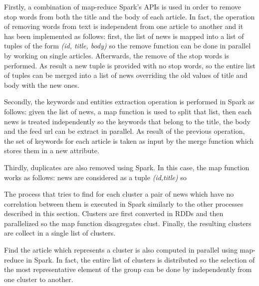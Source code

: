 \documentclass{acm_proc_article-sp}
\begin{document}

Firstly, a combination of map-reduce Spark's APIs is used in order to remove stop words from both the title and the body of each article. In fact, the operation of removing words from text is independent from one article to another and it has been implemented as follows: first, the list of news is mapped into a list of tuples of the form \textit{(id, title, body)} so the remove function can be done in parallel by working on single articles. Afterwards, the remove of the stop words is performed. As result a new tuple is provided with no stop words, so the entire list of tuples can be merged into a list of news overriding the old values of title and body with the new ones.



Secondly, the keywords and entities extraction operation is performed in Spark as follows: given the list of news, a map function is used to split that list, then each news is treated independently so the keywords that belong to the title, the body and the feed url can be extract in parallel. As result of the previous operation, the set of keywords for each article is taken as input by the merge function which stores them in a new attribute.

Thirdly, duplicates are also removed using Spark. In this case, the map function works as follows: news are considered as a tuple \textit{(id,title)} so

The process that tries to find for each cluster a pair of news which have no correlation between them is executed in Spark similarly to the other processes described in this section. Clusters are first converted in RDDs and then parallelized so the map function disagregates clust. Finally, the resulting clusters are collect in a single list of clusters.

Find the article which represents a cluster is also computed in parallel using map-reduce in Spark. In fact, the entire list of clusters is distributed so the selection of the most representative element of the group can be done by independently from one cluster to another.
\end{document}
